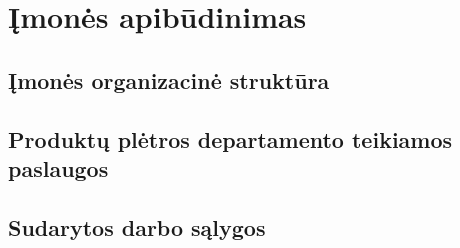 \section{Įmonės apibūdinimas}

\subsection{Įmonės organizacinė struktūra}

\subsection{Produktų plėtros departamento teikiamos paslaugos}

\subsection{Sudarytos darbo sąlygos}
